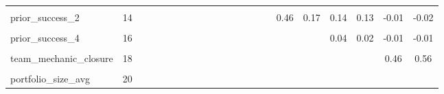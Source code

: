\begin{table}[!h]
\begin{tabular}[t]{lccccccccccccccccccccc}
\cellcolor{gray!10}{prior\_success\_1} & \cellcolor{gray!10}{13} & \cellcolor{gray!10}{} & \cellcolor{gray!10}{} & \cellcolor{gray!10}{} & \cellcolor{gray!10}{} & \cellcolor{gray!10}{} & \cellcolor{gray!10}{} & \cellcolor{gray!10}{} & \cellcolor{gray!10}{} & \cellcolor{gray!10}{} & \cellcolor{gray!10}{} & \cellcolor{gray!10}{} & \cellcolor{gray!10}{} & \cellcolor{gray!10}{} & \cellcolor{gray!10}{0.26} & \cellcolor{gray!10}{0.13} & \cellcolor{gray!10}{0.04} & \cellcolor{gray!10}{0.61} & \cellcolor{gray!10}{0.11} & \cellcolor{gray!10}{0} & \cellcolor{gray!10}{0}\\
prior\_success\_2 & 14 &  &  &  &  &  &  &  &  &  &  &  &  &  &  & 0.46 & 0.17 & 0.14 & 0.13 & -0.01 & -0.02\\
\cellcolor{gray!10}{prior\_success\_3} & \cellcolor{gray!10}{15} & \cellcolor{gray!10}{} & \cellcolor{gray!10}{} & \cellcolor{gray!10}{} & \cellcolor{gray!10}{} & \cellcolor{gray!10}{} & \cellcolor{gray!10}{} & \cellcolor{gray!10}{} & \cellcolor{gray!10}{} & \cellcolor{gray!10}{} & \cellcolor{gray!10}{} & \cellcolor{gray!10}{} & \cellcolor{gray!10}{} & \cellcolor{gray!10}{} & \cellcolor{gray!10}{} & \cellcolor{gray!10}{} & \cellcolor{gray!10}{0.36} & \cellcolor{gray!10}{0.03} & \cellcolor{gray!10}{0.04} & \cellcolor{gray!10}{-0.01} & \cellcolor{gray!10}{-0.01}\\
\addlinespace
prior\_success\_4 & 16 &  &  &  &  &  &  &  &  &  &  &  &  &  &  &  &  & 0.04 & 0.02 & -0.01 & -0.01\\
\cellcolor{gray!10}{performance\_disparity} & \cellcolor{gray!10}{17} & \cellcolor{gray!10}{} & \cellcolor{gray!10}{} & \cellcolor{gray!10}{} & \cellcolor{gray!10}{} & \cellcolor{gray!10}{} & \cellcolor{gray!10}{} & \cellcolor{gray!10}{} & \cellcolor{gray!10}{} & \cellcolor{gray!10}{} & \cellcolor{gray!10}{} & \cellcolor{gray!10}{} & \cellcolor{gray!10}{} & \cellcolor{gray!10}{} & \cellcolor{gray!10}{} & \cellcolor{gray!10}{} & \cellcolor{gray!10}{} & \cellcolor{gray!10}{} & \cellcolor{gray!10}{0.25} & \cellcolor{gray!10}{0.01} & \cellcolor{gray!10}{0.01}\\
team\_mechanic\_closure & 18 &  &  &  &  &  &  &  &  &  &  &  &  &  &  &  &  &  &  & 0.46 & 0.56\\
\cellcolor{gray!10}{portfolio\_size\_heterogeneity} & \cellcolor{gray!10}{19} & \cellcolor{gray!10}{} & \cellcolor{gray!10}{} & \cellcolor{gray!10}{} & \cellcolor{gray!10}{} & \cellcolor{gray!10}{} & \cellcolor{gray!10}{} & \cellcolor{gray!10}{} & \cellcolor{gray!10}{} & \cellcolor{gray!10}{} & \cellcolor{gray!10}{} & \cellcolor{gray!10}{} & \cellcolor{gray!10}{} & \cellcolor{gray!10}{} & \cellcolor{gray!10}{} & \cellcolor{gray!10}{} & \cellcolor{gray!10}{} & \cellcolor{gray!10}{} & \cellcolor{gray!10}{} & \cellcolor{gray!10}{} & \cellcolor{gray!10}{0.81}\\
portfolio\_size\_avg & 20 &  &  &  &  &  &  &  &  &  &  &  &  &  &  &  &  &  &  &  & \\
\bottomrule
\end{tabular}
\end{table}

